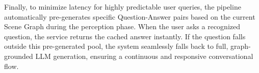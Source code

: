 Finally, to minimize latency for highly predictable user queries, the pipeline automatically pre-generates specific Question-Answer pairs based on the current Scene Graph during the perception phase. When the user asks a recognized question, the service returns the cached answer instantly. If the question falls outside this pre-generated pool, the system seamlessly falls back to full, graph-grounded LLM generation, ensuring a continuous and responsive conversational flow.
